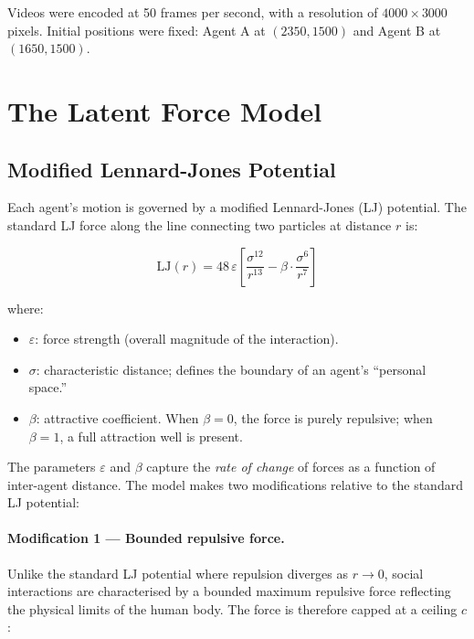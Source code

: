 \documentclass[11pt,a4paper]{article}
\begin{document}
\noindent Videos were encoded at 50 frames per second, with a resolution of $4000 \times 3000$ pixels. Initial positions were fixed: Agent A at $(2350, 1500)$ and Agent B at $(1650, 1500)$.

\section{The Latent Force Model}

\subsection{Modified Lennard-Jones Potential}

Each agent's motion is governed by a modified Lennard-Jones (LJ) potential. The standard LJ force along the line connecting two particles at distance $r$ is:

\begin{equation}
    \mathrm{LJ}(r) = 48\,\varepsilon \left[ \frac{\sigma^{12}}{r^{13}} - \beta \cdot \frac{\sigma^{6}}{r^{7}} \right]
\end{equation}

\noindent where:
\begin{itemize}
    \item $\varepsilon$: force strength (overall magnitude of the interaction).
    \item $\sigma$: characteristic distance; defines the boundary of an agent's ``personal space.''
    \item $\beta$: attractive coefficient. When $\beta = 0$, the force is purely repulsive; when $\beta = 1$, a full attraction well is present.
\end{itemize}

\noindent The parameters $\varepsilon$ and $\beta$ capture the \emph{rate of change} of forces as a function of inter-agent distance. The model makes two modifications relative to the standard LJ potential:

\paragraph{Modification 1 --- Bounded repulsive force.} Unlike the standard LJ potential where repulsion diverges as $r \to 0$, social interactions are characterised by a bounded maximum repulsive force reflecting the physical limits of the human body. The force is therefore capped at a ceiling $c$:
\end{document}
